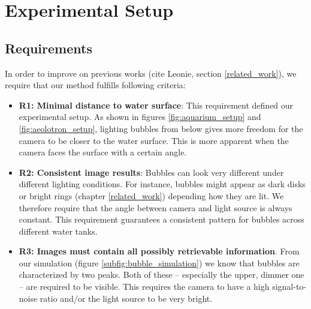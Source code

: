 \chapter{Experimental Setup}\label{experimental_setup}
	\section{Requirements}\label{requirements}
		In order to improve on previous works (cite Leonie, section \ref{related_work}), we require that our method fulfills following criteria:
	\begin{itemize}
		\item \textbf{R1: Minimal distance to water surface}: This requirement defined our experimental setup. As shown in figures \ref{fig:aquarium_setup} and \ref{fig:aeolotron_setup}, lighting bubbles from below gives more freedom for the camera to be closer to the water surface. This is more apparent when the camera faces the surface with a certain angle. 
		\item \textbf{R2: Consistent image results}: Bubbles can look very different under different lighting conditions. For instance, bubbles might appear as dark disks or bright rings (chapter \ref{related_work}) depending how they are lit. We therefore require that the angle between camera and light source is always constant. This requirement guarantees a consistent pattern for bubbles across different water tanks.
		\item \textbf{R3: Images must contain all possibly retrievable information}. From our simulation (figure \ref{subfig:bubble_simulation}) we know that bubbles are characterized by two peaks. Both of these – especially the upper, dimmer one – are required to be visible. This requires the camera to have a high signal-to-noise ratio and/or the light source to be very bright. 
	\end{itemize}	
		
